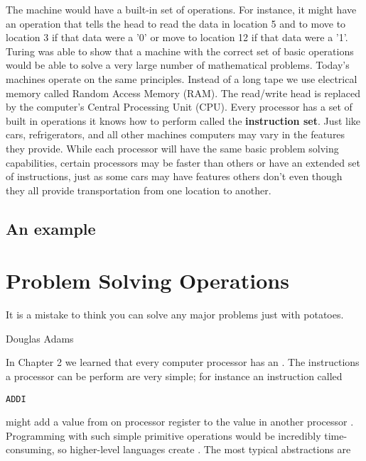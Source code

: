 \documentclass[11pt,fleqn]{book} %
\begin{document}
{The machine would have a built-in set of operations.  For instance, it might have an operation that tells the head to read the data in location 5 and to move to location 3 if that data were a '0' or move to location 12 if that data were a '1'.  Turing was able to show that a machine with the correct set of basic operations would be able to solve a very large number of mathematical problems.  Today's machines operate on the same principles.  Instead of a long tape we use electrical memory called Random Access Memory (RAM).  The read/write head is replaced by the computer's Central Processing Unit (CPU).  Every processor has a set of built in operations it knows how to perform called the \textbf{instruction set}.   Just like cars, refrigerators, and all other machines computers may vary in the features they provide.  While each processor will have the same basic problem solving capabilities, certain processors may be faster than others or have an extended set of instructions, just as some cars may have features others don't even though they all provide transportation from one location to another. 

\section{An example}

\chapter{Problem Solving Operations}

\epigraph{It is a mistake to think you can solve any major problems just with potatoes.}{Douglas Adams}

In Chapter 2 we learned that every computer processor has an .  The instructions a processor can be perform are very simple; for instance an instruction called \begin{verbatim}ADDI\end{verbatim} might add a value from on processor register to the value in another processor .  Programming with such simple primitive operations would be incredibly time-consuming, so higher-level languages create  .  The most typical abstractions are 

}
\end{document}
